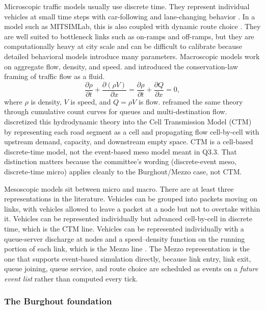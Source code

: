 \begin{bibunit}[plainnat]
Microscopic traffic models usually use discrete time. They represent individual vehicles at small time steps with car-following and lane-changing behavior \citep{treiber2000idm,kesting2007mobil}. In a model such as MITSIMLab, this is also coupled with dynamic route choice \citep{burghout2004thesis}. They are well suited to bottleneck links such as on-ramps and off-ramps, but they are computationally heavy at city scale and can be difficult to calibrate because detailed behavioral models introduce many parameters. Macroscopic models work on aggregate flow, density, and speed. \citet{lighthill1955kinematic} and \citet{richards1956shock} introduced the conservation-law framing of traffic flow as a fluid.
\[
  \frac{\partial \rho}{\partial t}
  + \frac{\partial(\rho V)}{\partial x}
  = \frac{\partial \rho}{\partial t} + \frac{\partial Q}{\partial x}
  = 0,
\]
where $\rho$ is density, $V$ is speed, and $Q=\rho V$ is flow. \citet{newell1993simplified} reframed the same theory through cumulative count curves for queues and multi-destination flow. \citet{daganzo1994ctm} discretized this hydrodynamic theory into the Cell Transmission Model (CTM) by representing each road segment as a cell and propagating flow cell-by-cell with upstream demand, capacity, and downstream empty space. CTM is a cell-based discrete-time model, not the event-based meso model meant in Q3.3. That distinction matters because the committee's wording (discrete-event meso, discrete-time micro) applies cleanly to the Burghout/Mezzo case, not CTM.

Mesoscopic models sit between micro and macro. There are at least three representations in the literature. Vehicles can be grouped into packets moving on links, with vehicles allowed to leave a packet at a node but not to overtake within it. Vehicles can be represented individually but advanced cell-by-cell in discrete time, which is the CTM line. Vehicles can be represented individually with a queue-server discharge at nodes and a speed--density function on the running portion of each link, which is the Mezzo line \citep{burghout2006discrete}. The Mezzo representation is the one that supports event-based simulation directly, because link entry, link exit, queue joining, queue service, and route choice are scheduled as events on a \textit{future event list} rather than computed every tick.

\subsubsection{The Burghout foundation}


\end{bibunit}
